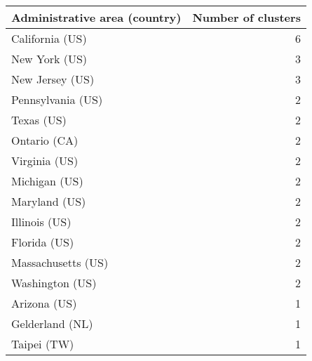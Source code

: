 \begin{tabular}{lr}
\toprule
Administrative area (country) &  Number of clusters \\
\midrule
              California (US) &                   6 \\
                New York (US) &                   3 \\
              New Jersey (US) &                   3 \\
            Pennsylvania (US) &                   2 \\
                   Texas (US) &                   2 \\
                 Ontario (CA) &                   2 \\
                Virginia (US) &                   2 \\
                Michigan (US) &                   2 \\
                Maryland (US) &                   2 \\
                Illinois (US) &                   2 \\
                 Florida (US) &                   2 \\
           Massachusetts (US) &                   2 \\
              Washington (US) &                   2 \\
                 Arizona (US) &                   1 \\
              Gelderland (NL) &                   1 \\
                  Taipei (TW) &                   1 \\
\bottomrule
\end{tabular}
